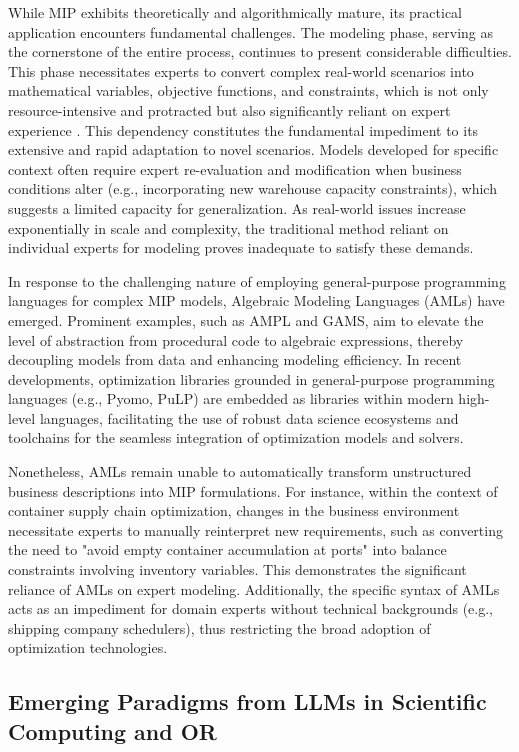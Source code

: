 \documentclass[preprint,12pt]{elsarticle}
\begin{document}
While MIP exhibits theoretically and algorithmically mature, its practical application encounters fundamental challenges. The modeling phase, serving as the cornerstone of the entire process, continues to present considerable difficulties. This phase necessitates experts to convert complex real-world scenarios into mathematical variables, objective functions, and constraints, which is not only resource-intensive and protracted but also significantly reliant on expert experience \cite{liLargeLanguageModels2023}. This dependency constitutes the fundamental impediment to its extensive and rapid adaptation to novel scenarios. Models developed for specific context often require expert re-evaluation and modification when business conditions alter (e.g., incorporating new warehouse capacity constraints), which suggests a limited capacity for generalization. As real-world issues increase exponentially in scale and complexity, the traditional method reliant on individual experts for modeling proves inadequate to satisfy these demands.

In response to the challenging nature of employing general-purpose programming languages for complex MIP models, Algebraic Modeling Languages (AMLs) have emerged. Prominent examples, such as AMPL and GAMS, aim to elevate the level of abstraction from procedural code to algebraic expressions, thereby decoupling models from data and enhancing modeling efficiency. In recent developments, optimization libraries grounded in general-purpose programming languages (e.g., Pyomo, PuLP) are embedded as libraries within modern high-level languages, facilitating the use of robust data science ecosystems and toolchains for the seamless integration of optimization models and solvers.

Nonetheless, AMLs remain unable to automatically transform unstructured business descriptions into MIP formulations. For instance, within the context of container supply chain optimization, changes in the business environment necessitate experts to manually reinterpret new requirements, such as converting the need to "avoid empty container accumulation at ports" into balance constraints involving inventory variables. This demonstrates the significant reliance of AMLs on expert modeling. Additionally, the specific syntax of AMLs acts as an impediment for domain experts without technical backgrounds (e.g., shipping company schedulers), thus restricting the broad adoption of optimization technologies.

\subsection{Emerging Paradigms from LLMs in Scientific Computing and OR}
\end{document}
